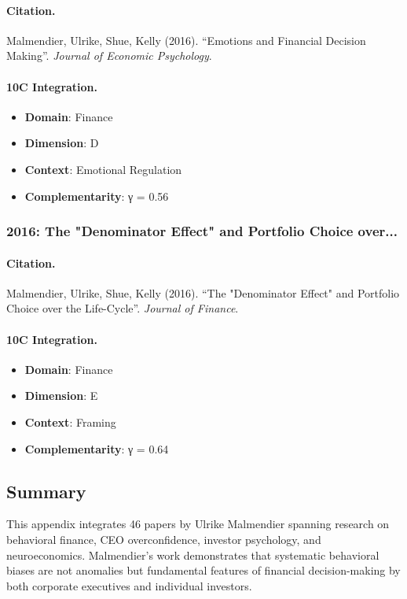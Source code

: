 \paragraph{Citation.}
Malmendier, Ulrike, Shue, Kelly (2016). ``Emotions and Financial Decision Making''. \textit{Journal of Economic Psychology}.

\paragraph{10C Integration.}
\begin{itemize}[nosep]
  \item \textbf{Domain}: Finance
  \item \textbf{Dimension}: D
  \item \textbf{Context}: Emotional Regulation
  \item \textbf{Complementarity}: γ = 0.56
\end{itemize}


\subsubsection{2016: The "Denominator Effect" and Portfolio Choice over...}

\paragraph{Citation.}
Malmendier, Ulrike, Shue, Kelly (2016). ``The "Denominator Effect" and Portfolio Choice over the Life-Cycle''. \textit{Journal of Finance}.

\paragraph{10C Integration.}
\begin{itemize}[nosep]
  \item \textbf{Domain}: Finance
  \item \textbf{Dimension}: E
  \item \textbf{Context}: Framing
  \item \textbf{Complementarity}: γ = 0.64
\end{itemize}


\subsection{Summary}

This appendix integrates 46 papers by Ulrike Malmendier spanning research on behavioral finance, CEO overconfidence, investor psychology, and neuroeconomics. Malmendier's work demonstrates that systematic behavioral biases are not anomalies but fundamental features of financial decision-making by both corporate executives and individual investors.

